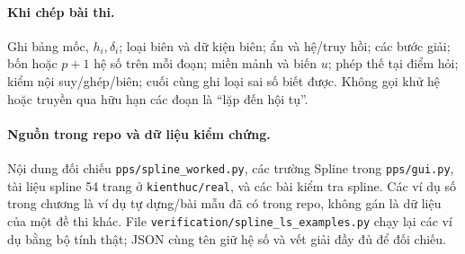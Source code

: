 \paragraph{Khi chép bài thi.}
Ghi bảng mốc, $h_i,\delta_i$; loại biên và dữ kiện biên; ẩn và hệ/truy hồi;
các bước giải; bốn hoặc $p+1$ hệ số trên mỗi đoạn; miền mảnh và biến $u$;
phép thế tại điểm hỏi; kiểm nội suy/ghép/biên; cuối cùng ghi loại sai số biết được.
Không gọi khử hệ hoặc truyền qua hữu hạn các đoạn là ``lặp đến hội tụ''.

\paragraph{Nguồn trong repo và dữ liệu kiểm chứng.}
Nội dung đối chiếu \texttt{pps/spline\_worked.py}, các trường Spline trong
\texttt{pps/gui.py}, tài liệu spline 54 trang ở \texttt{kienthuc/real}, và các bài kiểm tra spline.
Các ví dụ số trong chương là ví dụ tự dựng/bài mẫu đã có trong repo, không gán là dữ liệu của một đề thi khác.
File \texttt{verification/spline\_ls\_examples.py} chạy lại các ví dụ bằng bộ tính thật;
JSON cùng tên giữ hệ số và vết giải đầy đủ để đối chiếu.
